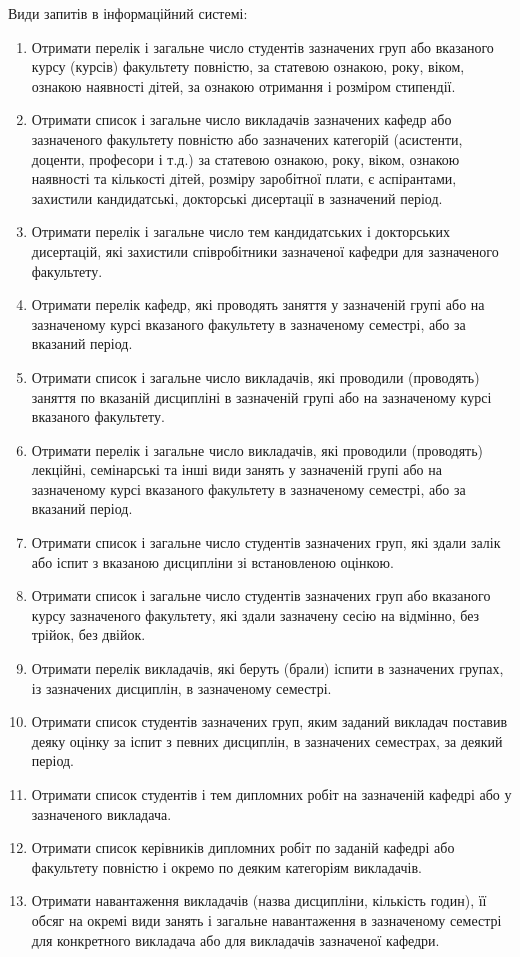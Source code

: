 \label{task_list}Види запитів в інформаційний системі:
\begin{enumerate}
    \item Отримати перелік і загальне число студентів зазначених груп 
    або вказаного курсу (курсів) факультету повністю, 
    за статевою ознакою, року, віком, ознакою наявності дітей, 
    за ознакою отримання і розміром стипендії. 
    \item Отримати список і загальне число викладачів зазначених кафедр 
    або зазначеного факультету повністю або зазначених категорій 
    (асистенти, доценти, професори і т.д.) за статевою ознакою, 
    року, віком, ознакою наявності та кількості дітей, розміру 
    заробітної плати, є аспірантами, захистили кандидатські, 
    докторські дисертації в зазначений період.
    \item Отримати перелік і загальне число тем кандидатських 
    і докторських дисертацій, які захистили співробітники 
    зазначеної кафедри для зазначеного факультету.
    \item Отримати перелік кафедр, які проводять заняття 
    у зазначеній групі або на зазначеному курсі 
    вказаного факультету в зазначеному семестрі, 
    або за вказаний період.
    \item Отримати список і загальне число викладачів, 
    які проводили (проводять) заняття по вказаній 
    дисципліні в зазначеній групі або на зазначеному 
    курсі вказаного факультету.
    \item Отримати перелік і загальне число викладачів, 
    які проводили (проводять) лекційні, семінарські 
    та інші види занять у зазначеній групі або на 
    зазначеному курсі вказаного факультету в зазначеному 
    семестрі, або за вказаний період.
    \item Отримати список і загальне число студентів 
    зазначених груп, які здали залік або іспит
    з вказаною дисципліни зі встановленою оцінкою.
    \item Отримати список і загальне число студентів 
    зазначених груп або вказаного курсу зазначеного 
    факультету, які здали зазначену сесію на відмінно, 
    без трійок, без двійок.
    \item Отримати перелік викладачів, які беруть (брали) 
    іспити в зазначених групах, із зазначених дисциплін, 
    в зазначеному семестрі.
    \item Отримати список студентів зазначених груп, 
    яким заданий викладач поставив деяку оцінку 
    за іспит з певних дисциплін, в зазначених семестрах, 
    за деякий період.
    \item Отримати список студентів і тем дипломних робіт 
    на зазначеній кафедрі або у зазначеного викладача.
    \item Отримати список керівників дипломних робіт 
    по заданій кафедрі або факультету повністю 
    і окремо по деяким категоріям викладачів.
    \item Отримати навантаження викладачів (назва дисципліни, кількість годин), 
    її обсяг на окремі види занять і загальне навантаження в зазначеному 
    семестрі для конкретного викладача або для викладачів зазначеної кафедри.
\end{enumerate}